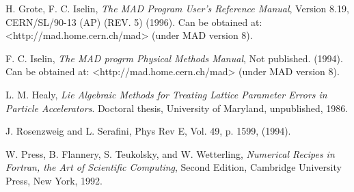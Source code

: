 \begin{thebibliography}{99}

H. Grote, F. C. Iselin, {\it The MAD Program User's Reference Manual}, Version 8.19,
CERN/SL/90-13 (AP) (REV. 5) (1996). Can be obtained at: <http://mad.home.cern.ch/mad>
(under MAD version 8).

F. C. Iselin, {\it The MAD progrm Physical Methods Manual}, Not published. (1994).
Can be obtained at: <http://mad.home.cern.ch/mad> (under MAD version 8).

L. M. Healy, {\it Lie Algebraic Methods for Treating Lattice Parameter Errors in
Particle Accelerators}. Doctoral thesis, University of Maryland, unpublished, 1986.

J. Rosenzweig and L. Serafini, Phys Rev E, Vol. 49, p. 1599, (1994).

W. Press, B. Flannery, S. Teukolsky, and W. Wetterling, {\em Numerical
Recipes in Fortran, the Art of Scientific Computing}, Second Edition,
Cambridge University Press, New York, 1992.


\end{thebibliography}
